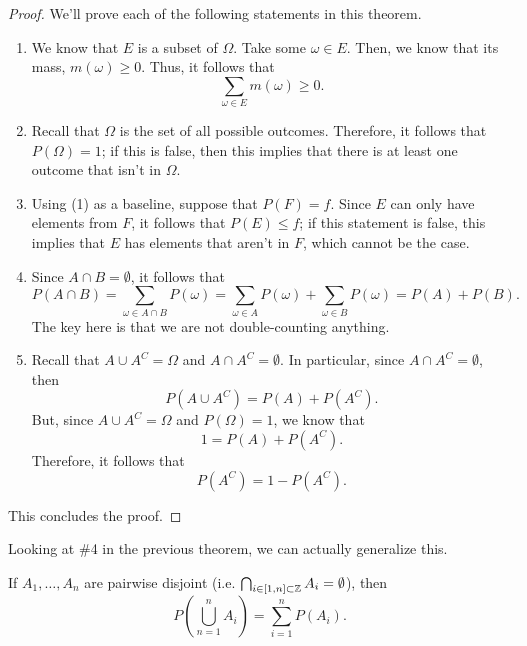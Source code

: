 \documentclass[letterpaper]{article}
\begin{document}
\begin{mdframed}[]
    \begin{proof}
        We'll prove each of the following statements in this theorem.
        \begin{enumerate}
            \item We know that $E$ is a subset of $\Omega$. Take some $\omega \in E$. Then, we know that its mass, $m(\omega) \geq 0$. Thus, it follows that 
            \[\sum_{\omega \in E} m(\omega) \geq 0.\]

            \item Recall that $\Omega$ is the set of all possible outcomes. Therefore, it follows that $P(\Omega) = 1$; if this is false, then this implies that there is at least one outcome that isn't in $\Omega$. 
            
            \item Using (1) as a baseline, suppose that $P(F) = f$. Since $E$ can only have elements from $F$, it follows that $P(E) \leq f$; if this statement is false, this implies that $E$ has elements that aren't in $F$, which cannot be the case.
            
            \item Since $A \cap B = \emptyset$, it follows that 
            \[P(A \cap B) = \sum_{\omega \in A \cap B} P(\omega) = \sum_{\omega \in A} P(\omega) + \sum_{\omega \in B} P(\omega) = P(A) + P(B).\]
            The key here is that we are not double-counting anything. 

            \item Recall that $A \cup A^C = \Omega$ and $A \cap A^C = \emptyset$. In particular, since $A \cap A^C = \emptyset$, then
            \[P(A \cup A^C) = P(A) + P(A^C).\]
            But, since $A \cup A^C = \Omega$ and $P(\Omega) = 1$, we know that 
            \[1 = P(A) + P(A^C).\]
            Therefore, it follows that 
            \[P(A^C) = 1 - P(A^C).\]
        \end{enumerate}
        This concludes the proof. 
    \end{proof}
\end{mdframed}
Looking at \#4 in the previous theorem, we can actually generalize this. 
\begin{theorem}{}{}
    If $A_1, \dots, A_n$ are pairwise disjoint (i.e. $\bigcap_{i \in [1, n] \subset \mathbb{Z}} A_i = \emptyset$), then 
    \[P\left(\bigcup_{n = 1}^{n} A_i\right) = \sum_{i = 1}^{n} P(A_i).\]
\end{theorem}
\end{document}
